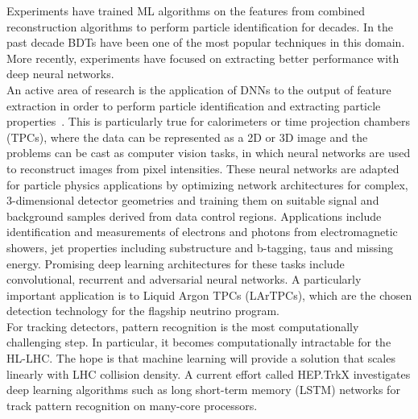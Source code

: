 
Experiments have trained ML algorithms on the features from combined reconstruction algorithms to perform particle identification for decades. In the past decade BDTs have been one of the most popular techniques in this domain. More recently, experiments have focused on extracting better performance with deep neural networks.\\

An active area of research is the application of DNNs to the output of feature extraction in order to perform particle identification and extracting particle properties~\cite{LHCbPID}.  This is particularly true for calorimeters or time projection chambers (TPCs), where the data can be represented as a 2D or 3D image and the problems can be cast as computer vision tasks, in which neural networks are used to reconstruct images from pixel intensities. These neural networks are adapted for particle physics applications by optimizing network architectures for complex, 3-dimensional detector geometries and training them on suitable signal and background samples derived from data control regions. Applications include identification and measurements of electrons and photons from electromagnetic showers, jet properties including substructure and b-tagging, taus and missing energy. Promising deep learning architectures for these tasks include convolutional, recurrent and adversarial neural networks. A particularly important application is to Liquid Argon TPCs (LArTPCs), which are the chosen detection technology for the flagship neutrino program.\\ %

For tracking detectors, pattern recognition is the most computationally challenging step. In particular, it becomes computationally intractable for the HL-LHC. The hope is that machine learning will provide a solution that scales linearly with LHC collision density. A current effort called HEP.TrkX investigates deep learning algorithms such as long short-term memory (LSTM) networks for track pattern recognition on many-core processors.

